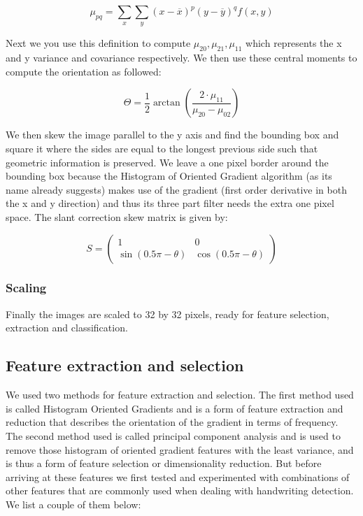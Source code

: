 \documentclass[%
        compressed,
        final,
        notitlepage,
        narroweqnarray,
        inline,
        twoside,
        ]{ieee}
\begin{document}
\begin{equation}
    \mu_{pq} = \sum_x \sum_y (x - \overline{x})^p(y - \overline{y})^q f(x, y)
\end{equation}

 
Next we you use this definition to compute $\mu_{20}, \mu_{21}, \mu_{11}$ which represents the x and y variance and covariance respectively. We then use these central moments to compute the orientation as followed:

\begin{equation}
    \Theta = \frac{1}{2} \arctan \left(
        \frac{2 \cdot \mu_{11}}{\mu_{20} - \mu_{02}}
    \right)
\end{equation}

We then skew the image parallel to the y axis and find the bounding box and square it where the sides are equal to the longest previous side such that geometric information is preserved. We leave a one pixel border around the bounding box because the Histogram of Oriented Gradient algorithm (as its name already suggests) makes use of the gradient (first order derivative in both the x and y direction) and thus its three part filter needs the extra one pixel space. The slant correction skew matrix is given by:

\begin{equation}
    S = \begin{pmatrix}
        1 & 0 \\
        \sin(0.5 \pi - \theta) & \cos(0.5 \pi - \theta)
    \end{pmatrix}
\end{equation}

\subsubsection{Scaling}
Finally the images are scaled to 32 by 32 pixels, ready for feature selection, extraction and classification.
\subsection{Feature extraction and selection}
We used two methods for feature extraction and selection. The first method used
is called Histogram Oriented Gradients and is a form of feature extraction and
reduction that describes the orientation of the gradient in terms of frequency. The second method used is called principal component analysis and is used to remove those histogram of oriented gradient features with the least variance, and is thus a form of feature selection or dimensionality reduction. But before arriving at these features we first tested and experimented with combinations of other features that are commonly used when dealing with handwriting detection. We list a couple of them below:\\
\end{document}
